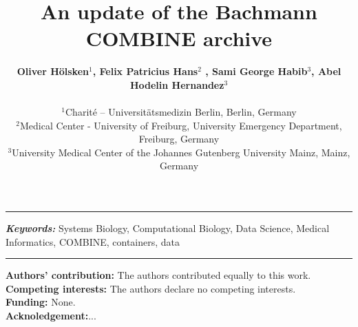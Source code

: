 \documentclass[a4paper, 12pt]{article}
\title{An update of the Bachmann COMBINE archive}
\date{} %
\newcommand\orcidicon[1]{\href{https://orcid.org/#1}{\mbox{\scalerel*{
\begin{tikzpicture}[yscale=-1,transform shape]
\pic{orcidlogo};
\end{tikzpicture}
}{|}}}}
\providecommand{\keywords}[1]
{
  \small	
  \textbf{\textit{Keywords: }} #1
}
\begin{document}
\maketitle

  \noindent\author{\textbf{Oliver H\"olsken$^{1}$, Felix Patricius Hans$^{2}$ %
  , Sami George Habib$^{3}$, Abel Hodelin Hernandez$^{3}$} \\ \\
	\small $^{1}$Charité – Universitätsmedizin Berlin, Berlin, Germany \\
	\small $^{2}$Medical Center - University of Freiburg, University Emergency Department, Freiburg, Germany \\
	\small $^{3}$University Medical Center of the Johannes Gutenberg University Mainz, Mainz, Germany \\
}
\hrule

 \hspace{10pt}

\keywords{Systems Biology, Computational Biology, Data Science, Medical Informatics, COMBINE, containers, data}

\hrule

\newpage








\noindent\small \textbf{Authors' contribution:} The authors contributed equally to this work. \\ 
\noindent\small \textbf{Competing interests:} The authors declare no competing interests.\\
\noindent\small \textbf{Funding:} None.\\
\noindent\small \textbf{Acknoledgement:}...


\nocite{*}           %
\printbibliography 
\end{document}
